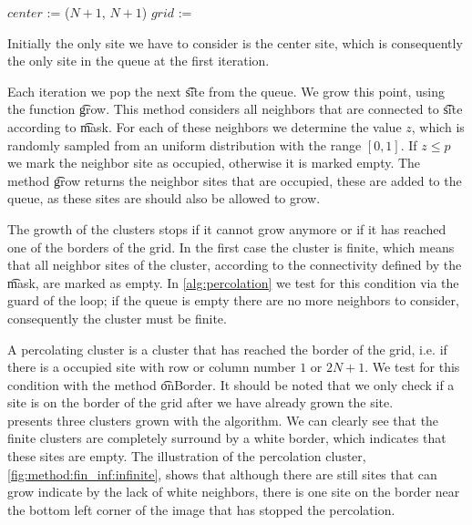 \begin{algorithm}[t]
	\SetAlgoShortEnd
	\DontPrintSemicolon
	\BlankLine

	$center$ := ($N + 1$, $N + 1$)\; 
	\; 
	$grid$ := \; 

	\; 
	\caption{$(mask, N, p)$\label{alg:percolation}}
\end{algorithm}

Initially the only site we have to consider is the center site, which is consequently the only site in the queue at the first iteration.

Each iteration we pop the next \t{site} from the queue. We grow this point, using the function \t{grow}. This method considers all neighbors that are connected to \t{site} according to \t{mask}. For each of these neighbors we determine the value $z$, which is randomly sampled from an uniform distribution with the range $[0,1]$. If $z \leq p$ we mark the neighbor site as occupied, otherwise it is marked empty. The method \t{grow} returns the neighbor sites that are occupied, these are added to the queue, as these sites are should also be allowed to grow. 

The growth of the clusters stops if it cannot grow anymore or if it has reached one of the borders of the grid. In the first case the cluster is finite, which means that all neighbor sites of the cluster, according to the connectivity defined by the \t{mask}, are marked as empty. In \cref{alg:percolation} we test for this condition via the guard of the loop; if the queue is empty there are no more neighbors to consider, consequently the cluster must be finite. 

A percolating cluster is a cluster that has reached the border of the grid, i.e. if there is a occupied site with row or column number $1$ or $2N + 1$. We test for this condition with the method \t{onBorder}. It should be noted that we only check if a site is on the border of the grid after we have already grown the site. \\

 presents three clusters grown with the algorithm. We can clearly see that the finite clusters are completely surround by a white border, which indicates that these sites are empty. The illustration of the percolation cluster, \cref{fig:method:fin_inf:infinite}, shows that although there are still sites that can grow indicate by the lack of white neighbors, there is one site on the border near the bottom left corner of the image that has stopped the percolation. 

